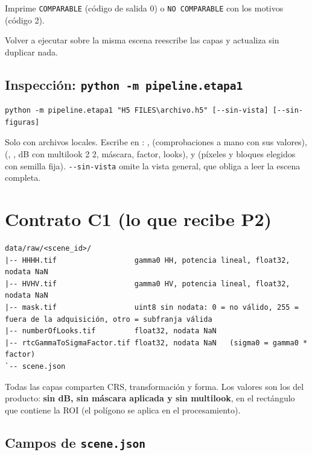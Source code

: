 \documentclass[11pt,a4paper]{article}
\begin{document}
Imprime \texttt{COMPARABLE} (código de salida 0) o \texttt{NO COMPARABLE} con los motivos (código 2).

Volver a ejecutar sobre la misma escena reescribe las capas y actualiza  sin duplicar nada.

\subsection{Inspección: \texttt{python -m pipeline.etapa1}}
\label{sec:inspeccion}

\begin{lstlisting}
python -m pipeline.etapa1 "H5 FILES\archivo.h5" [--sin-vista] [--sin-figuras]
\end{lstlisting}

Solo con archivos locales. Escribe en : , 
(comprobaciones a mano con sus valores),  (\gz, \sz, dB con multilook 2\,\por\,2, máscara, factor, looks),
 y  (píxeles y bloques elegidos con semilla fija). \texttt{-{}-sin-vista} omite la vista general, que
obliga a leer la escena completa.

\section{Contrato C1 (lo que recibe P2)}

\begin{lstlisting}
data/raw/<scene_id>/
|-- HHHH.tif                  gamma0 HH, potencia lineal, float32, nodata NaN
|-- HVHV.tif                  gamma0 HV, potencia lineal, float32, nodata NaN
|-- mask.tif                  uint8 sin nodata: 0 = no válido, 255 = fuera de la adquisición, otro = subfranja válida
|-- numberOfLooks.tif         float32, nodata NaN
|-- rtcGammaToSigmaFactor.tif float32, nodata NaN   (sigma0 = gamma0 * factor)
`-- scene.json
\end{lstlisting}

Todas las capas comparten CRS, transformación y forma. Los valores son los del producto: \textbf{sin dB, sin máscara aplicada y sin
multilook}, en el rectángulo que contiene la ROI (el polígono se aplica en el procesamiento).

\subsection*{Campos de \texttt{scene.json}}
\end{document}

